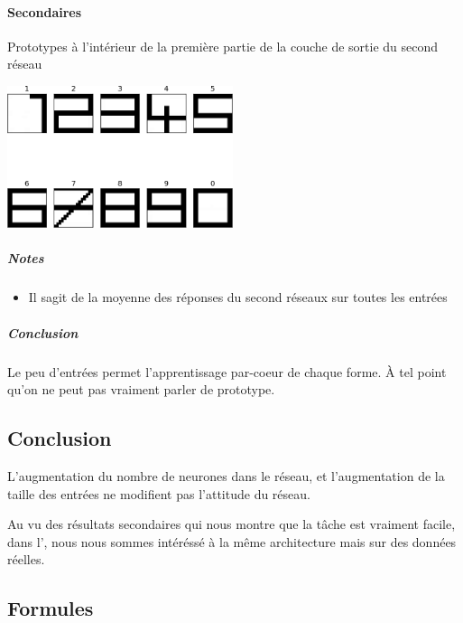     \paragraph{Secondaires}
      Prototypes à l'intérieur de la première partie de la couche de sortie du second réseau
      \begin{center}
	\includegraphics[width=250px]{data/expA2/prototype.png}
      \end{center} 
      \subparagraph{Notes}
	\begin{itemize}
	  \item Il sagit de la moyenne des réponses du second réseaux sur toutes les entrées
	\end{itemize}
      \subparagraph{Conclusion}
	Le peu d'entrées permet l'apprentissage par-coeur de chaque forme. À tel point qu'on ne peut pas vraiment
	parler de prototype.
	


  \subsection{Conclusion}
    L'augmentation du nombre de neurones dans le réseau, et l'augmentation de la taille des entrées
    ne modifient pas l'attitude du réseau.
    
    Au vu des résultats secondaires qui nous montre que la tâche est vraiment facile, dans l',
    nous nous sommes intéréssé à la même architecture mais sur des données réelles.
  

  \newpage 
  \subsection{Formules}
    
    
    




